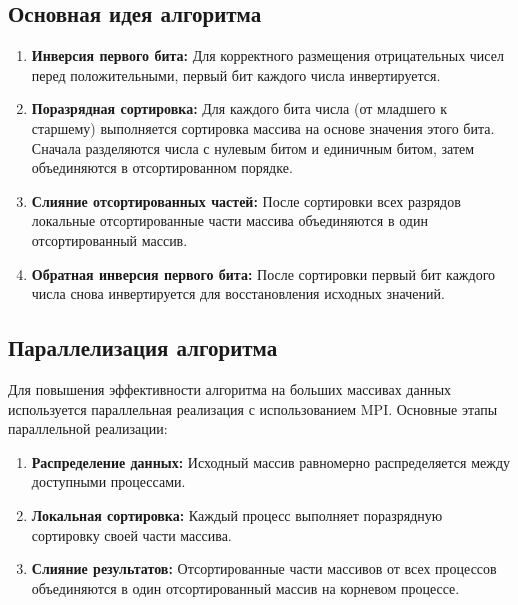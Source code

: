\documentclass[12pt]{article}
\begin{document}
\subsection{Основная идея алгоритма}

\begin{enumerate}
  \item \textbf{Инверсия первого бита:} Для корректного размещения отрицательных чисел перед положительными, первый бит каждого числа инвертируется.
  
  \item \textbf{Поразрядная сортировка:} Для каждого бита числа (от младшего к старшему) выполняется сортировка массива на основе значения этого бита. Сначала разделяются числа с нулевым битом и единичным битом, затем объединяются в отсортированном порядке.
  
  \item \textbf{Слияние отсортированных частей:} После сортировки всех разрядов локальные отсортированные части массива объединяются в один отсортированный массив.
  
  \item \textbf{Обратная инверсия первого бита:} После сортировки первый бит каждого числа снова инвертируется для восстановления исходных значений.
\end{enumerate}

\subsection{Параллелизация алгоритма}

Для повышения эффективности алгоритма на больших массивах данных используется параллельная реализация с использованием MPI. Основные этапы параллельной реализации:

\begin{enumerate}
  \item \textbf{Распределение данных:} Исходный массив равномерно распределяется между доступными процессами.
  
  \item \textbf{Локальная сортировка:} Каждый процесс выполняет поразрядную сортировку своей части массива.
  
  \item \textbf{Слияние результатов:} Отсортированные части массивов от всех процессов объединяются в один отсортированный массив на корневом процессе.
\end{enumerate}

\end{document}
